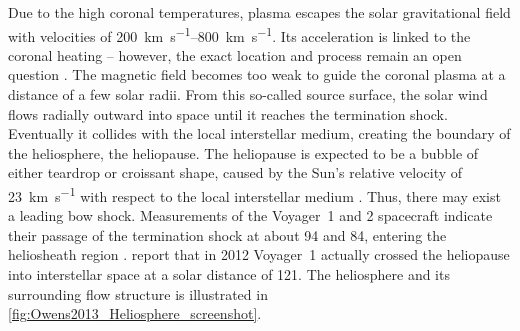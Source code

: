 Due to the high coronal temperatures, plasma escapes the solar gravitational field \citep{Parker1958} with velocities of \SIrange{200}{800}{\km\per\s}. Its acceleration is linked to the coronal heating -- however, the exact location and process remain an open question \citep{Hollweg1985,McComas2007,Fox2015,Cranmer2017}. The magnetic field becomes too weak to guide the coronal plasma at a distance of a few solar radii. From this so-called source surface, the solar wind flows radially outward into space until it reaches the termination shock. Eventually it collides with the local interstellar medium, creating the boundary of the heliosphere, the heliopause. The heliopause is expected to be a bubble of either teardrop or croissant shape, caused by the Sun's relative velocity of \SI{23}{\km\per\s} with respect to the local interstellar medium \citep{Owens2013, Opher2015}. Thus, there may exist a leading bow shock. Measurements of the Voyager~1 and 2 spacecraft indicate their passage of the termination shock at about \SI{94}{\au} and \SI{84}{\au}, entering the heliosheath region \citep{Owens2013}. \citet{Gurnett2013} report that in 2012 Voyager~1 actually crossed the heliopause into interstellar space at a solar distance of \SI{121}{\au}. The heliosphere and its surrounding flow structure is illustrated in \autoref{fig:Owens2013_Heliosphere_screenshot}.
